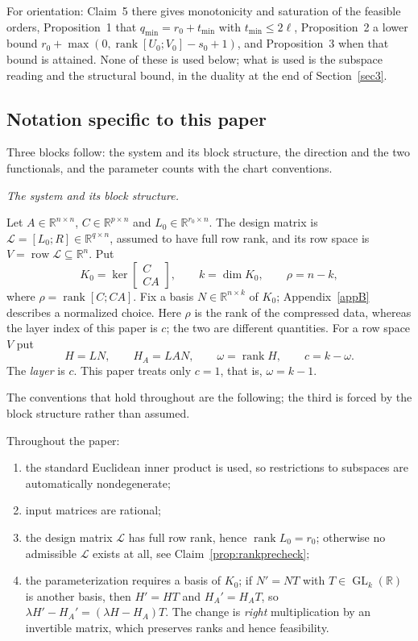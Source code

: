 \documentclass[journal]{IEEEtran}
\theoremstyle{plainn}
\theoremstyle{remark}
\newcommand{\row}{\operatorname{row}}
\newcommand{\rank}{\operatorname{rank}}
\begin{document}
For orientation: Claim~5 there gives monotonicity and saturation of the feasible orders, Proposition~1
that $q_{\min}=r_0+t_{\min}$ with $t_{\min}\le2\ell$, Proposition~2 a lower bound
$r_0+\max(0,\operatorname{rank}[U_0;V_0]-s_0+1)$, and Proposition~3 when that bound is attained. None
of these is used below; what is used is the subspace reading and the structural bound, in the duality
at the end of Section~\ref{sec3}.

\subsection{Notation specific to this paper}\label{sec:prelim:notation}

Three blocks follow: the system and its block structure, the direction and the two functionals, and
the parameter counts with the chart conventions.

\emph{The system and its block structure.}

Let $A\in\mathbb R^{n\times n}$, $C\in\mathbb R^{p\times n}$ and $L_0\in\mathbb R^{r_0\times n}$. The
design matrix is $\mathcal L=[L_0;R]\in\mathbb R^{q\times n}$, assumed to have full row rank, and its
row space is $V=\row\mathcal L\subseteq\mathbb R^n$. Put
\begin{equation}
  \label{eq:K0}
  K_0=\ker\left[\begin{smallmatrix}C\\ CA\end{smallmatrix}\right],\qquad
  k=\dim K_0,\qquad
  \rho=n-k,
\end{equation}
where $\rho=\rank[C;CA]$. Fix a basis $N\in\mathbb R^{n\times k}$ of $K_0$; Appendix~\ref{appB}
describes a normalized
choice. Here $\rho$ is the rank of the compressed data, whereas the layer index of this paper is $c$;
the two are different quantities. For a row space $V$ put
\begin{equation}
  \label{eq:compressed-data}
  H=LN,\qquad H_A=LAN,\qquad \omega=\rank H,\qquad c=k-\omega .
\end{equation}
The \emph{layer} is $c$. This paper treats only $c=1$, that is, $\omega=k-1$.


The conventions that hold throughout are the following; the third is forced by the block structure
rather than assumed.

Throughout the paper:
\begin{enumerate}[label=(\roman*),leftmargin=*,itemsep=2pt]
\item the standard Euclidean inner product is used, so restrictions to subspaces are automatically
nondegenerate;
\item input matrices are rational;
\item the design matrix $\mathcal L$ has full row rank, hence $\rank L_0=r_0$; otherwise no admissible
$\mathcal L$ exists at all, see Claim~\ref{prop:rankprecheck};
\item the parameterization requires a basis of $K_0$; if $N'=NT$ with $T\in\operatorname{GL}_k(\mathbb R)$
is another basis, then $H'=HT$ and $H_A'=H_AT$, so $\lambda H'-H_A'=(\lambda H-H_A)T$. The change is
\emph{right} multiplication by an invertible matrix, which preserves ranks and hence feasibility.
\end{enumerate}
\end{document}
